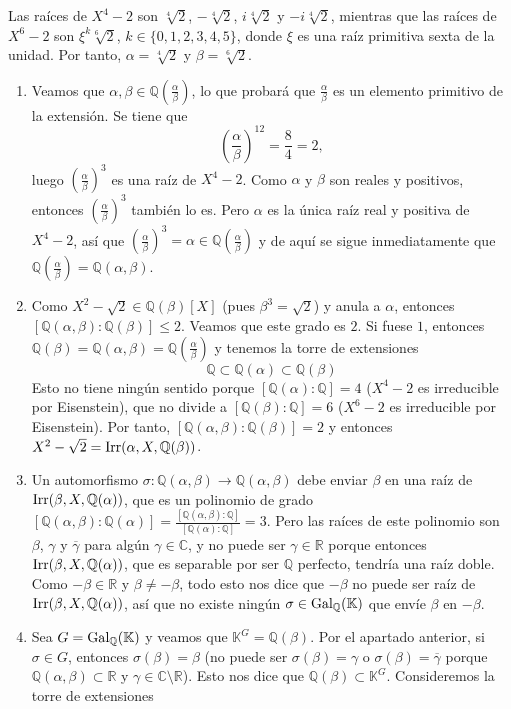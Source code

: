 \documentclass[11pt]{report}
\makeatletter
\renewenvironment{proof}[1][\proofname]{\par
  \pushQED{\qed}%
  \normalfont \topsep\z@skip %
  \trivlist
  \item[\hskip\labelsep
        \itshape
    #1\@addpunct{.}]\ignorespaces
}{%
  \popQED\endtrivlist\@endpefalse
}
\newcommand{\R}{\mathbb R}
\newcommand{\Q}{\mathbb Q}
\newcommand{\C}{\mathbb C}
\newcommand{\K}{\mathbb K}
\makeatother
\begin{document}
\begin{proof}
Las raíces de $X^4-2$ son $\sqrt[4]{2}$, $-\sqrt[4]{2}$, $i\sqrt[4]{2}$ y $-i\sqrt[4]{2}$, mientras que las raíces de $X^6-2$ son $\xi^k\sqrt[6]{2}$, $k \in \{0,1,2,3,4,5\}$, donde $\xi$ es una raíz primitiva sexta de la unidad. Por tanto, $\alpha = \sqrt[4]{2}$ y $\beta = \sqrt[6]{2}$.
\begin{enumerate}
    \item Veamos que $\alpha, \beta \in \Q(\frac{\alpha}{\beta})$, lo que probará que $\frac{\alpha}{\beta}$ es un elemento primitivo de la extensión. Se tiene que
    \[\left(\frac{\alpha}{\beta}\right)^{12} = \frac{8}{4} = 2,\]
    luego $(\frac{\alpha}{\beta})^3$ es una raíz de $X^4-2$. Como $\alpha$ y $\beta$ son reales y positivos, entonces $(\frac{\alpha}{\beta})^3$ también lo es. Pero $\alpha$ es la única raíz real y positiva de $X^4-2$, así que $(\frac{\alpha}{\beta})^3 = \alpha \in \Q(\frac{\alpha}{\beta})$ y de aquí se sigue inmediatamente que $\Q(\frac{\alpha}{\beta}) = \Q(\alpha,\beta)$.
    \item Como $X^2-\sqrt{2} \in \Q(\beta)[X]$ (pues $\beta^3 =\sqrt{2}$) y anula a $\alpha$, entonces $[\Q(\alpha,\beta) \colon \Q(\beta)] \leq 2$. Veamos que este grado es $2$. Si fuese $1$, entonces $\Q(\beta) = \Q(\alpha,\beta) = \Q(\frac{\alpha}{\beta})$ y tenemos la torre de extensiones
    \[\Q \subset \Q(\alpha) \subset \Q(\beta)\]
    Esto no tiene ningún sentido porque $[\Q(\alpha) \colon \Q] = 4$ ($X^4-2$ es irreducible por Eisenstein), que no divide a $[\Q(\beta) \colon \Q]=6$ ($X^6-2$ es irreducible por Eisenstein). Por tanto, $[\Q(\alpha,\beta) \colon \Q(\beta)] = 2$ y entonces $X^2-\sqrt{2} = \textup{Irr}(\alpha,X,\Q(\beta))$.
    \item Un automorfismo $\sigma \colon \Q(\alpha,\beta) \to \Q(\alpha,\beta)$ debe enviar $\beta$ en una raíz de $\textup{Irr}(\beta,X,\Q(\alpha))$, que es un polinomio de grado $[\Q(\alpha,\beta) \colon \Q(\alpha)] = \frac{[\Q(\alpha,\beta) \colon \Q]}{[\Q(\alpha) \colon \Q]} = 3$. Pero las raíces de este polinomio son $\beta$, $\gamma$ y $\overline{\gamma}$ para algún $\gamma \in \C$, y no puede ser $\gamma \in \R$ porque entonces $\textup{Irr}(\beta,X,\Q(\alpha))$, que es separable por ser $\Q$ perfecto, tendría una raíz doble. Como $-\beta \in \R$ y $\beta \neq -\beta$, todo esto nos dice que $-\beta$ no puede ser raíz de $\textup{Irr}(\beta,X,\Q(\alpha))$, así que no existe ningún $\sigma \in \textup{Gal}_\Q(\K)$ que envíe $\beta$ en $-\beta$.
    \item Sea $G = \textup{Gal}_\Q(\K)$ y veamos que $\K^G = \Q(\beta)$. Por el apartado anterior, si $\sigma \in G$, entonces $\sigma(\beta) = \beta$ (no puede ser $\sigma(\beta) = \gamma$ o $\sigma(\beta) = \overline{\gamma}$ porque $\Q(\alpha,\beta) \subset \R$ y $\gamma \in \C \setminus \R$). Esto nos dice que $\Q(\beta) \subset \K^G$. Consideremos la torre de extensiones

\end{enumerate}
\end{proof}
\end{document}
